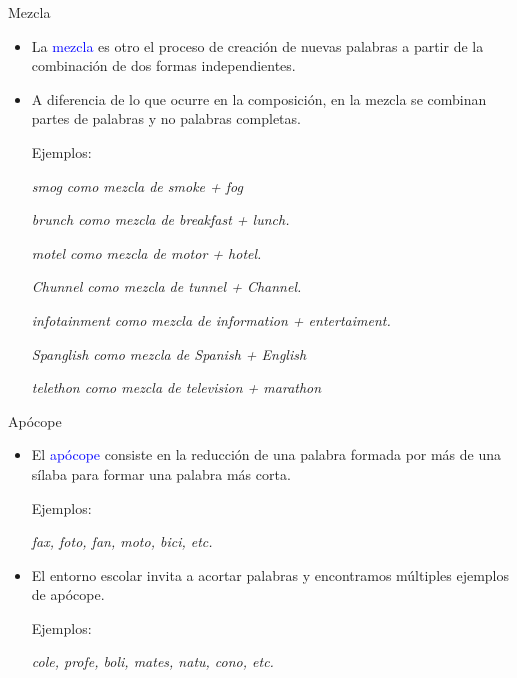 \documentclass{beamer}
\begin{document}
\begin{frame}{Mezcla}

\begin{itemize}
	\item La \textcolor{blue}{mezcla} es otro el proceso de creación de nuevas palabras a partir de la combinación de dos formas independientes.
	\item A diferencia de lo que ocurre en la composición, en la mezcla se combinan partes de palabras y no palabras completas.
	
	Ejemplos: 
	
	\it{smog} como mezcla de \it{smoke} + \it{fog}

	\it{brunch} como mezcla de \it{breakfast} + \it{lunch}.

	\it{motel} como mezcla de \it{motor} + \it{hotel}.

	\it{Chunnel} como mezcla de \it{tunnel} + \it{Channel}.

	\it{infotainment} como mezcla de \it{information} + \it{entertaiment}.

	\it{Spanglish} como mezcla de \it{Spanish} + \it{English}
	
	\it{telethon} como mezcla de \it{television} + \it{marathon}
	
\end{itemize}

\end{frame}

\begin{frame}{Apócope}

\begin{itemize}
	\item El \textcolor{blue}{apócope} consiste en la reducción de una palabra formada por más de una sílaba para formar una palabra más corta.
	
	Ejemplos: 
	
	\it{fax, foto, fan, moto, bici}, etc.
		
	\item El entorno escolar invita a acortar palabras y encontramos múltiples ejemplos de apócope.
	
	Ejemplos: 
	
	\it{cole, profe, boli, mates, natu, cono}, etc.
\end{itemize}

\end{frame}
\end{document}
